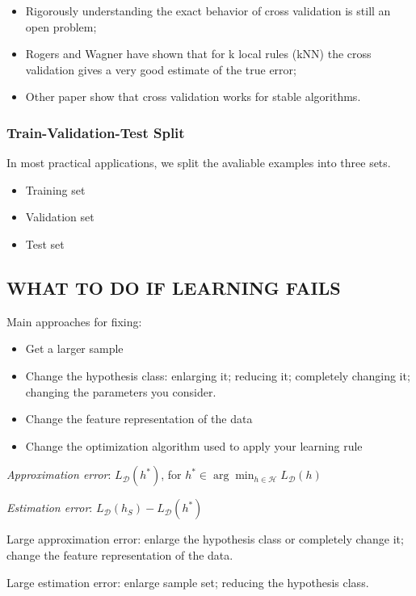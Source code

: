 \begin{itemize}
	\item Rigorously understanding the exact behavior of cross validation is still an open problem;
	\item Rogers and Wagner have shown that for k local rules (kNN) the cross validation gives a very good estimate of the true error;
	\item Other paper show that cross validation works for stable algorithms.
\end{itemize}

\subsubsection{Train-Validation-Test Split}

In most practical applications, we split the avaliable examples into three sets.
\begin{itemize}
	\item Training set
	\item Validation set
	\item Test set
\end{itemize}

\subsection{WHAT TO DO IF LEARNING FAILS}

Main approaches for fixing:
\begin{itemize}
	\item Get a larger sample
	\item Change the hypothesis class: enlarging it; reducing it; completely changing it; changing the parameters you consider.
	\item Change the feature representation of the data
	\item Change the optimization algorithm used to apply your learning rule
\end{itemize}

\emph{Approximation error}: $ L_\mathcal{D}(h^*) $, for $ h^* \in \arg\min_{h\in\mathcal{H}} L_\mathcal{D} (h) $

\emph{Estimation error}: $ L_\mathcal{D}(h_S) - L_\mathcal{D} (h^*) $ 

Large approximation error: enlarge the hypothesis class or completely change it; change the feature representation of the data.

Large estimation error: enlarge sample set; reducing the hypothesis class.


